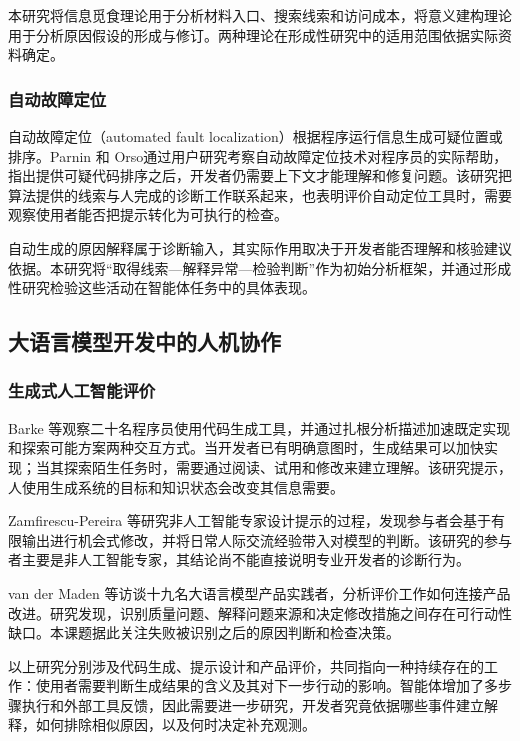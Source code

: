 本研究将信息觅食理论用于分析材料入口、搜索线索和访问成本，将意义建构理论用于分析原因假设的形成与修订。两种理论在形成性研究中的适用范围依据实际资料确定。

\subsubsection{自动故障定位}

自动故障定位（automated fault localization）根据程序运行信息生成可疑位置或排序。Parnin 和 Orso\cite{ref35}通过用户研究考察自动故障定位技术对程序员的实际帮助，指出提供可疑代码排序之后，开发者仍需要上下文才能理解和修复问题。该研究把算法提供的线索与人完成的诊断工作联系起来，也表明评价自动定位工具时，需要观察使用者能否把提示转化为可执行的检查。

自动生成的原因解释属于诊断输入，其实际作用取决于开发者能否理解和核验建议依据。本研究将“取得线索—解释异常—检验判断”作为初始分析框架，并通过形成性研究检验这些活动在智能体任务中的具体表现。

\subsection{大语言模型开发中的人机协作}

\subsubsection{生成式人工智能评价}

Barke 等\cite{ref64}观察二十名程序员使用代码生成工具，并通过扎根分析描述加速既定实现和探索可能方案两种交互方式。当开发者已有明确意图时，生成结果可以加快实现；当其探索陌生任务时，需要通过阅读、试用和修改来建立理解。该研究提示，人使用生成系统的目标和知识状态会改变其信息需要。

Zamfirescu-Pereira 等\cite{ref65}研究非人工智能专家设计提示的过程，发现参与者会基于有限输出进行机会式修改，并将日常人际交流经验带入对模型的判断。该研究的参与者主要是非人工智能专家，其结论尚不能直接说明专业开发者的诊断行为。

van der Maden 等\cite{ref01}访谈十九名大语言模型产品实践者，分析评价工作如何连接产品改进。研究发现，识别质量问题、解释问题来源和决定修改措施之间存在可行动性缺口。本课题据此关注失败被识别之后的原因判断和检查决策。

以上研究分别涉及代码生成、提示设计和产品评价，共同指向一种持续存在的工作：使用者需要判断生成结果的含义及其对下一步行动的影响。智能体增加了多步骤执行和外部工具反馈，因此需要进一步研究，开发者究竟依据哪些事件建立解释，如何排除相似原因，以及何时决定补充观测。

